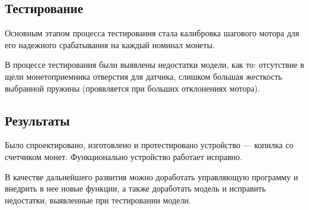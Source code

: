 \subsection {Тестирование}

Основным этапом процесса тестирования стала калибровка шагового мотора для его надежного срабатывания на каждый номинал монеты.

В процессе тестирования были выявлены недостатки модели, как то: отсутствие в щели монетоприемника отверстия для датчика, слишком большая жесткость выбранной пружины (проявляется при больших отклонениях мотора).

\subsection {Результаты}

Было спроектировано, изготовлено и протестировано устройство — копилка со счетчиком монет. Функционально устройство работает исправно.

В качестве дальнейшего развития можно доработать управляющую программу и внедрить в нее новые функции, а также доработать модель и исправить недостатки, выявленные при тестировании модели.